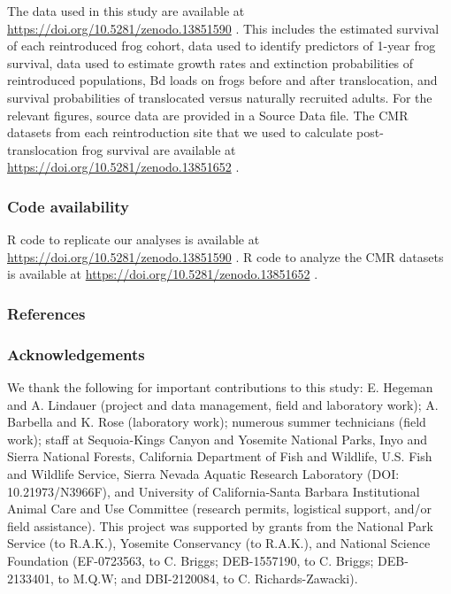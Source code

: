 \documentclass[
  letterpaper,
  DIV=11,
  numbers=noendperiod]{scrartcl}
\begin{document}
The data used in this study are available at
\url{https://doi.org/10.5281/zenodo.13851590} \citep{knapp2024a}. This
includes the estimated survival of each reintroduced frog cohort, data
used to identify predictors of 1-year frog survival, data used to
estimate growth rates and extinction probabilities of reintroduced
populations, Bd loads on frogs before and after translocation, and
survival probabilities of translocated versus naturally recruited
adults. For the relevant figures, source data are provided in a Source
Data file. The CMR datasets from each reintroduction site that we used
to calculate post-translocation frog survival are available at
\url{https://doi.org/10.5281/zenodo.13851652} \citep{knapp2024b}.

\subsubsection{Code availability}\label{code-availability}

R code to replicate our analyses is available at
\url{https://doi.org/10.5281/zenodo.13851590} \citep{knapp2024a}. R code
to analyze the CMR datasets is available at
\url{https://doi.org/10.5281/zenodo.13851652} \citep{knapp2024b}.

\subsubsection{References}\label{references}

\renewcommand{\bibsection}{}


\newpage

\subsubsection{Acknowledgements}\label{acknowledgements}

We thank the following for important contributions to this study: E.
Hegeman and A. Lindauer (project and data management, field and
laboratory work); A. Barbella and K. Rose (laboratory work); numerous
summer technicians (field work); staff at Sequoia-Kings Canyon and
Yosemite National Parks, Inyo and Sierra National Forests, California
Department of Fish and Wildlife, U.S. Fish and Wildlife Service, Sierra
Nevada Aquatic Research Laboratory (DOI: 10.21973/N3966F), and
University of California-Santa Barbara Institutional Animal Care and Use
Committee (research permits, logistical support, and/or field
assistance). This project was supported by grants from the National Park
Service (to R.A.K.), Yosemite Conservancy (to R.A.K.), and National
Science Foundation (EF-0723563, to C. Briggs; DEB-1557190, to C. Briggs;
DEB-2133401, to M.Q.W; and DBI-2120084, to C. Richards-Zawacki).
\end{document}
